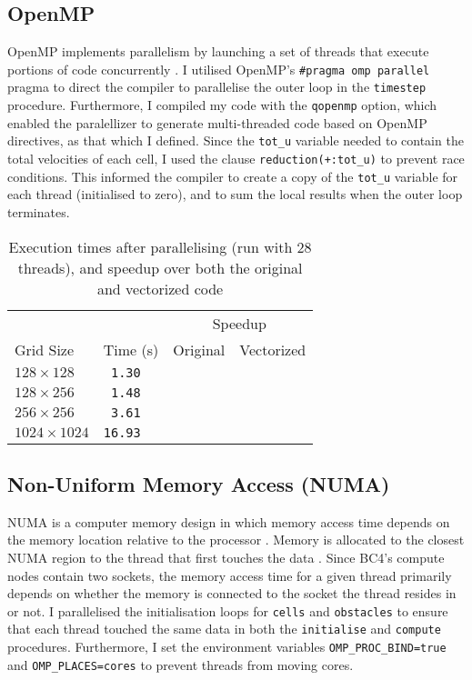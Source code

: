 \documentclass[11pt, twocolumn, a4paper]{article}
\begin{document}
\subsection{OpenMP}

OpenMP implements parallelism by launching a set of threads that execute portions of code concurrently \cite{openmp_cornell}.
I utilised OpenMP's \texttt{\#pragma omp parallel} pragma to direct the compiler to parallelise the outer loop in the \texttt{timestep} procedure.
Furthermore, I compiled my code with the \texttt{qopenmp} option, which enabled the paralellizer to generate multi-threaded code based on OpenMP directives, as that which I defined.
Since the \texttt{tot\_u} variable needed to contain the total velocities of each cell, I used the clause \texttt{reduction(+:tot\_u)} to prevent race conditions.
This informed the compiler to create a copy of the \texttt{tot\_u} variable for each thread (initialised to zero), and to sum the local results when the outer loop terminates.

\begin{table}[htbp]
  \begin{center}
  \caption{Execution times after parallelising (run with 28 threads), and speedup over both the original and vectorized code}\label{tab:parallelised}
  \begin{tabular}{l | l  l  l} 
      \hline\hline
      &&\multicolumn{2}{c}{Speedup}\\
      \cline{3-4}
      Grid Size&Time (s)&Original&Vectorized\\
      \hline
      $128 \times 128$&\texttt{ 1.30}&\texttt{}&\texttt{}\\
      $128 \times 256$&\texttt{ 1.48}&\texttt{}&\texttt{}\\
      $256 \times 256$&\texttt{ 3.61}&\texttt{}&\texttt{}\\
      $1024 \times 1024$&\texttt{16.93}&\texttt{}&\texttt{}\\
      \hline
    \end{tabular}
  \end{center}
\end{table}

\subsection{Non-Uniform Memory Access (NUMA)}

NUMA is a computer memory design in which memory access time depends on the memory location relative to the processor \cite{numa}.
Memory is allocated to the closest NUMA region to the thread that first touches the data \cite{numa_bristol}.
Since BC4's compute nodes contain two sockets, the memory access time for a given thread primarily depends on whether the memory is connected to the socket the thread resides in or not.
I parallelised the initialisation loops for \texttt{cells} and \texttt{obstacles} to ensure that each thread touched the same data in both the \texttt{initialise} and \texttt{compute} procedures.
Furthermore, I set the environment variables \texttt{OMP\_PROC\_BIND=true} and \texttt{OMP\_PLACES=cores} to prevent threads from moving cores.
\end{document}
